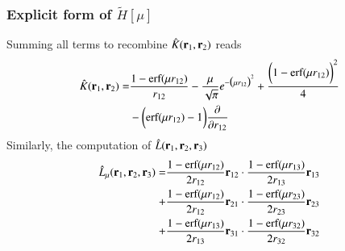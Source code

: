 \documentclass[aip,jcp,reprint,noshowkeys,superscriptaddress]{revtex4-1}
\newcommand{\deriv}[3]{\frac{\partial^{#3} #1}{\partial {#2}^{#3}}}
\newcommand{\bri}[1]{{\bf r}_{#1}}
\begin{document}
\subsubsection{Explicit form of $\tilde{H}[\mu]$}
Summing all terms to recombine $\hat{K}(\bri{1},\bri{2})$ reads 
\begin{equation}
 \label{eq:k_final}
  \begin{aligned}
   \hat{K}(\bri{1},\bri{2}) = & \frac{1 - \text{erf}(\mu r_{12})}{r_{12}} - \frac{\mu}{\sqrt{\pi}} e^{-\big(\mu r_{12} \big)^2} + \frac{\bigg(1 -     \text{erf}(\mu r_{12}) \bigg)^2}{4} \\
& - \bigg( \text{erf}(\mu r_{12}) - 1\bigg) \deriv{}{r_{12}}{}
  \end{aligned}
\end{equation}
Similarly, the computation of $\hat{L}(\bri{1},\bri{2},\bri{3}) $ 
\begin{equation}
 \label{eq:l_final}
 \begin{aligned}
 \hat{L}_\mu(\bri{1},\bri{2},\bri{3}) = & \frac{1 - \text{erf}(\mu r_{12})}{2 r_{12}} \bri{12} \cdot \frac{1 - \text{erf}(\mu r_{13})}{2 r_{13}} \bri{13} \\
                                      + & \frac{1 - \text{erf}(\mu r_{12})}{2 r_{12}} \bri{21} \cdot \frac{1 - \text{erf}(\mu r_{23})}{2 r_{23}} \bri{23} \\
                                      + & \frac{1 - \text{erf}(\mu r_{13})}{2 r_{13}} \bri{31} \cdot \frac{1 - \text{erf}(\mu r_{32})}{2 r_{32}} \bri{32}
 \end{aligned}                    
\end{equation}
\end{document}
